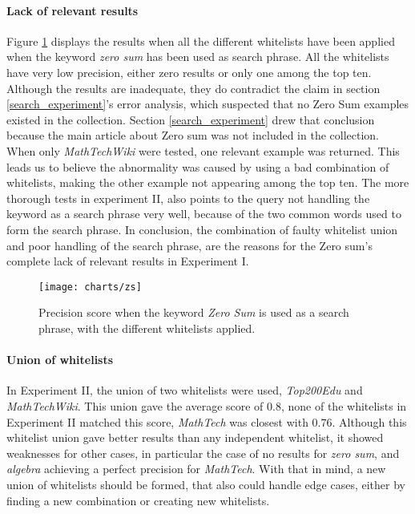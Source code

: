 \paragraph{Lack of relevant results}
Figure \ref{fig:zs} displays the results when all the different whitelists have been applied when the keyword \textit{zero sum} has been used as search phrase. All the whitelists have very low precision, either zero results or only one among the top ten. Although the results are inadequate, they do contradict the claim in section \ref{search_experiment}'s error analysis, which suspected that no Zero Sum examples existed in the collection. Section \ref{search_experiment} drew that conclusion because the main article about Zero sum was not included in the collection. When only \textit{MathTechWiki} were tested, one relevant example was returned. This leads us to believe the abnormality was caused by using a bad combination of whitelists, making the other example not appearing among the top ten. The more thorough tests in experiment II, also points to the query not handling the keyword as a search phrase very well, because of the two common words used to form the search phrase. In conclusion, the combination of faulty whitelist union and poor handling of the search phrase, are the reasons for the Zero sum's complete lack of relevant results in Experiment I.

\begin{figure}[h] 
\caption{Precision score when the keyword \textit{Zero Sum} is used as a search phrase, with the different whitelists applied.}
\texttt{[image: charts/zs]}
\label{fig:zs}
\end{figure}

\paragraph{Union of whitelists}
In Experiment II, the union of two whitelists were used, \textit{Top200Edu} and \textit{MathTechWiki}. This union gave the average score of \(0.8\), none of the whitelists in Experiment II matched this score, \textit{MathTech} was closest with \(0.76\). Although this whitelist union gave better results than any independent whitelist, it showed weaknesses for other cases, in particular the case of no results for \textit{zero sum}, and \textit{algebra} achieving a perfect precision for \textit{MathTech}. With that in mind, a new union of whitelists should be formed, that also could handle edge cases, either by finding a new combination or creating new whitelists.


